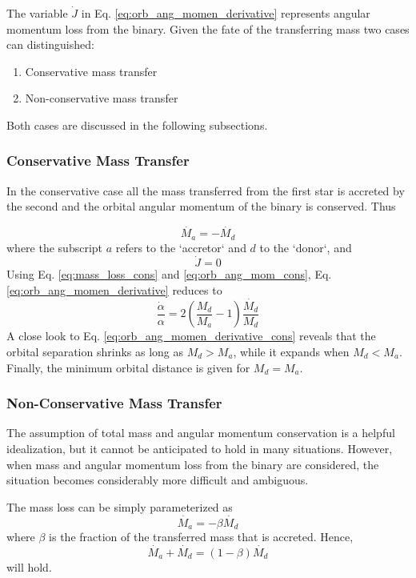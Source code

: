 The variable $\dot{J}$ in Eq. \eqref{eq:orb_ang_momen_derivative} represents angular momentum loss from the binary. Given the fate of the transferring mass two cases can distinguished: 
\begin{enumerate}
    \item Conservative mass transfer
    \item Non-conservative mass transfer
\end{enumerate}
Both cases are discussed in the following subsections.

\subsubsection{Conservative Mass Transfer}

In the conservative case all the mass transferred from the first star is accreted by the second and the orbital angular momentum of the binary is conserved. Thus

\begin{equation}\label{eq:mass_loss_cons}
    \dot{M_{a}} = - \dot{M_{d}}
\end{equation}
where the subscript $a$ refers to the `accretor` and $d$ to the `donor`, and
\begin{equation}\label{eq:orb_ang_mom_cons}
    \dot{J}=0
\end{equation}
Using Eq. \eqref{eq:mass_loss_cons} and \eqref{eq:orb_ang_mom_cons}, Eq. \eqref{eq:orb_ang_momen_derivative} reduces to
\begin{equation}\label{eq:orb_ang_momen_derivative_cons}
    \frac{\dot{\alpha}}{\alpha}= 2 \left( \frac{M_d}{M_a} - 1 \right) \frac{\dot{M_{d}}}{M_{d}}
\end{equation}    
A close look to Eq. \eqref{eq:orb_ang_momen_derivative_cons} reveals that the orbital separation shrinks as long as $M_d > M_a$, while it expands when $M_d < M_a$. Finally, the minimum orbital distance is given for $M_d = M_a$. 

\subsubsection{Non-Conservative Mass Transfer}

The assumption of total mass and angular momentum conservation is a helpful idealization, but it cannot be anticipated to hold in many situations. However, when mass and angular momentum loss from the binary are considered, the situation becomes considerably more difficult and ambiguous.

The mass loss can be simply parameterized as
\begin{equation}\label{eq:mass_loss_non_cons}
    \dot{M_{a}} = - \beta \dot{M_{d}}
\end{equation}
where $\beta$ is the fraction of the transferred mass that is accreted. Hence, 
\begin{equation}\label{eq:mass_loss_non_cons_2}
    \dot{M_{a}} + \dot{M_{d}} = (1 - \beta) \dot{M_{d}}
\end{equation}
will hold.